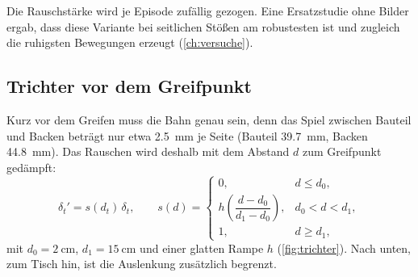 Die Rauschstärke wird je Episode zufällig gezogen. Eine Ersatzstudie ohne Bilder ergab, dass
diese Variante bei seitlichen Stößen am robustesten ist und zugleich die ruhigsten
Bewegungen erzeugt (\cref{ch:versuche}).

\subsection{Trichter vor dem Greifpunkt}

Kurz vor dem Greifen muss die Bahn genau sein, denn das Spiel zwischen Bauteil und Backen
beträgt nur etwa \SI{2.5}{\milli\metre} je Seite (Bauteil \SI{39.7}{\milli\metre}, Backen
\SI{44.8}{\milli\metre}). Das Rauschen wird deshalb mit dem Abstand $d$ zum Greifpunkt
gedämpft:
\begin{equation}
  \delta_t' = s(d_t)\,\delta_t,\qquad
  s(d) = \begin{cases}
    0, & d \le d_0,\\
    h\!\left(\dfrac{d - d_0}{d_1 - d_0}\right), & d_0 < d < d_1,\\
    1, & d \ge d_1,
  \end{cases}
  \label{eq:trichter}
\end{equation}
mit $d_0 = \SI{2}{\centi\metre}$, $d_1 = \SI{15}{\centi\metre}$ und einer glatten Rampe $h$
(\cref{fig:trichter}). Nach unten, zum Tisch hin, ist die Auslenkung zusätzlich begrenzt.

